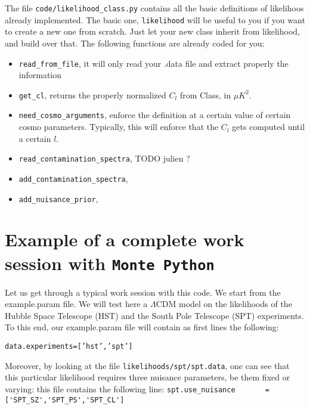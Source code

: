 \documentclass[10pt]{article}
\newcommand{\MP}{\texttt{Monte Python}}
\begin{document}
  The file \verb?code/likelihood_class.py? contains all the basic definitions
  of likelihoos already implemented. The basic one, \verb?likelihood? will be
  useful to you if you want to create a new one from scratch. Just let your new
  class inherit from likelihood, and build over that. The following functions are already coded for you:\\

  \begin{itemize}
    \item \verb?read_from_file?, it will only read your .data file and extract
      properly the information
    \item \verb?get_cl?, returns the properly normalized $C_l$ from Class, in $\mu K^2$.
    \item \verb?need_cosmo_arguments?, enforce the definition at a certain
      value of certain cosmo parameters. Typically, this will enforce that the
      $C_l$ gets computed until a certain $l$.
    \item \verb?read_contamination_spectra?, TODO julien ?
    \item \verb?add_contamination_spectra?,
    \item \verb?add_nuisance_prior?,
  \end{itemize}


  \newpage
  \section{Example of a complete work session with \MP}
  Let us get through a typical work session with this code. We start from the
  example.param file. We will test here a $\Lambda$CDM model on the likelihoods
  of the Hubble Space Telescope (HST) and the South Pole Telescope (SPT)
  experiments.\\

  To this end, our example.param file will contain as first lines the following:
  
  \begin{alltt}
    data.experiments = ['hst','spt']
  \end{alltt}

  Moreover, by looking at the file \verb?likelihoods/spt/spt.data?, one can see
  that this particular likelihood requires three nuisance parameters, be them
  fixed or varying: this file contains the following line:
  \verb?spt.use_nuisance	   = ['SPT_SZ','SPT_PS','SPT_CL']?
\end{document}
